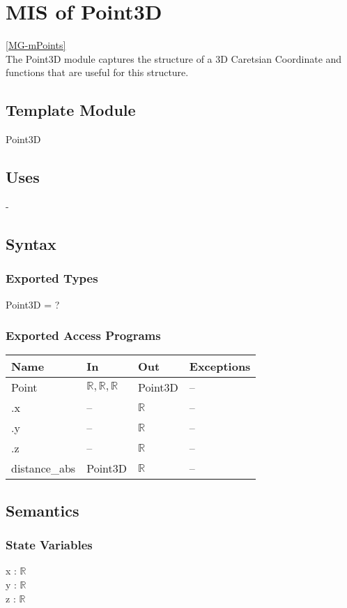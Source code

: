 \documentclass[12pt, titlepage]{article}
\begin{document}
\section{MIS of Point3D} \ref{MG-mPoints} \\
The Point3D module captures the structure of a 3D Caretsian Coordinate and 
functions that are useful for this structure.

\subsection{Template Module}
Point3D

\subsection{Uses} -

\subsection{Syntax}
\subsubsection{Exported Types}
Point3D = ?

\subsubsection{Exported Access Programs}
\begin{center}
	\begin{tabular}{p{4cm} p{2cm} p{2cm} p{4cm}}
		\hline
		\textbf{Name} & \textbf{In} & \textbf{Out} & \textbf{Exceptions} \\
		\hline
		Point & $\mathbb{R}, \mathbb{R}, \mathbb{R}$ & Point3D & -- \\
		.x & -- & $\mathbb{R}$ & -- \\
		.y & -- & $\mathbb{R}$ & -- \\		
		.z & -- & $\mathbb{R}$ & -- \\
		distance\_abs & Point3D & $\mathbb{R}$ & -- \\
		\hline
	\end{tabular}
\end{center}

\subsection{Semantics}
\subsubsection{State Variables}
x : $\mathbb{R}$ \\
y : $\mathbb{R}$ \\
z : $\mathbb{R}$ \\
\end{document}
